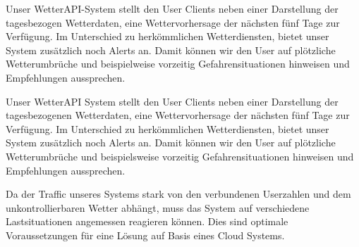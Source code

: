 Unser WetterAPI-System stellt den User Clients neben einer Darstellung der tagesbezogen Wetterdaten, eine Wettervorhersage der nächsten fünf Tage zur Verfügung. Im Unterschied zu herkömmlichen Wetterdiensten, bietet unser System zusätzlich noch Alerts an. Damit  können wir den User auf plötzliche Wetterumbrüche und beispielweise vorzeitig Gefahrensituationen hinweisen und Empfehlungen aussprechen. 

Unser WetterAPI System stellt den User Clients neben einer Darstellung der tagesbezogenen Wetterdaten, eine Wettervorhersage der nächsten fünf Tage zur Verfügung. Im Unterschied zu herkömmlichen Wetterdiensten, bietet unser System zusätzlich noch Alerts an. Damit  können wir den User auf plötzliche Wetterumbrüche und beispielsweise vorzeitig Gefahrensituationen hinweisen und Empfehlungen aussprechen. 

Da der Traffic unseres Systems stark von den verbundenen Userzahlen und dem unkontrollierbaren Wetter abhängt, muss  das System auf verschiedene Lastsituationen angemessen reagieren können. Dies sind optimale Voraussetzungen für eine Lösung auf Basis eines Cloud Systems.




